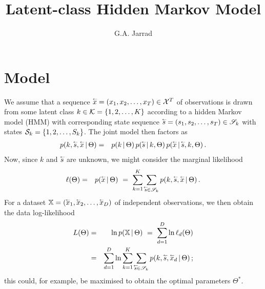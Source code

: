 \documentclass[a4paper]{article}
\title{Latent-class Hidden Markov Model}
\author{G.A. Jarrad}
\newcommand{\rvec}[1]{\accentset{\leftarrow}{#1}}
\begin{document}
\maketitle
{}
\section{Model}
We assume that a sequence $\rvec{x}=(x_1,x_2,\ldots,x_T)\in{\cal X}^T$ of
observations is drawn from some latent class $k\in{\cal K}=\{1,2,\ldots,K\}$
 according to a hidden Markov model (HMM) with corresponding state sequence
$\rvec{s}=(s_1,s_2,\ldots,s_T)\in\mathscr{S}_k$ with states 
${\cal S}_k=\{1,2,\ldots,S_k\}$.
The joint model then factors as
\begin{eqnarray}
p(k,\rvec{s},\rvec{x}\,|\,\Theta) & = &
p(k\,|\,\Theta)\,p(\rvec{s}\,|\,k,\Theta)\,p(\rvec{x}\,|\,\rvec{s},k,\Theta)\,.
\end{eqnarray}
Now, since $k$ and $\rvec{s}$ are unknown, we might consider the marginal
likelihood
\begin{eqnarray}
\ell(\Theta) & = & p(\rvec{x}\,|\,\Theta)
~=~\sum_{k=1}^K\sum_{\rvec{s}\in\mathscr{S}_k}
p(k,\rvec{s},\rvec{x}\,|\,\Theta)\,.
\end{eqnarray}
For a dataset $\mathbb{X}=(\rvec{x}_1,\rvec{x}_2,\ldots,\rvec{x}_D)$ of
independent observations, we then obtain the data log-likelihood
\begin{eqnarray}
L(\Theta) & = & \ln p(\mathbb{X}\,|\,\Theta)
~=~\sum_{d=1}^D \ln\ell_d(\Theta)
\nonumber\\
& = & \sum_{d=1}^D\ln\sum_{k=1}^K\sum_{\rvec{s}\in\mathscr{S}_k}
p(k,\rvec{s},\rvec{x}_d\,|\,\Theta)\,;
\end{eqnarray}
this could, for example, be maximised to obtain the optimal parameters
$\Theta^*$.
\end{document}
